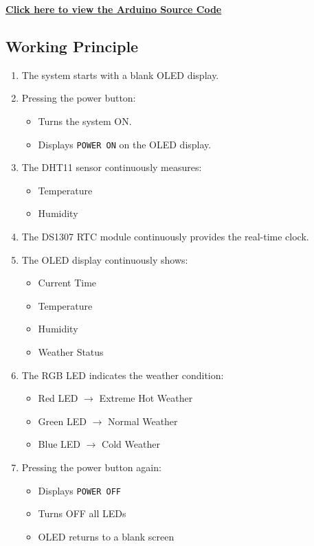 \href{https://github.com/YOUR_USERNAME/YOUR_REPOSITORY/blob/main/Exp-1/weather_forecast_system/weather_forecast_system.ino}
{\textbf{Click here to view the Arduino Source Code}}


\subsection{Working Principle}

\begin{enumerate}

\item The system starts with a blank OLED display.

\item Pressing the power button:
\begin{itemize}
    \item Turns the system ON.
    \item Displays \texttt{POWER ON} on the OLED display.
\end{itemize}

\item The DHT11 sensor continuously measures:
\begin{itemize}
    \item Temperature
    \item Humidity
\end{itemize}

\item The DS1307 RTC module continuously provides the real-time clock.

\item The OLED display continuously shows:
\begin{itemize}
    \item Current Time
    \item Temperature
    \item Humidity
    \item Weather Status
\end{itemize}

\item The RGB LED indicates the weather condition:
\begin{itemize}
    \item Red LED $\rightarrow$ Extreme Hot Weather
    \item Green LED $\rightarrow$ Normal Weather
    \item Blue LED $\rightarrow$ Cold Weather
\end{itemize}

\item Pressing the power button again:
\begin{itemize}
    \item Displays \texttt{POWER OFF}
    \item Turns OFF all LEDs
    \item OLED returns to a blank screen
\end{itemize}

\end{enumerate}

